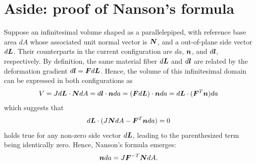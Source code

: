 \section{Aside: proof of Nanson's formula}
Suppose an infinitesimal volume shaped as a parallelepiped, with reference base area $dA$ whose associated unit normal vector is $\bm{N}$, and a out-of-plane side vector $d\bm{L}$. 
Their counterparts in the current configuration are $da$, $\bm{n}$, and $d\bm{l}$, respectively. 
By definition, the same material fiber $d\bm{L}$ and $d\bm{l}$ are related by the deformation gradient $d\bm{l} = \bm{F} d\bm{L}$. 
Hence, the volume of this infinitesimal domain can be expressed in both configurations as 
\begin{equation}
    V = J d\bm{L} \cdot \bm{N}dA = d\bm{l} \cdot \bm{n} da = (\bm{F}d\bm{L}) \cdot \bm{n}da = d\bm{L} \cdot (\bm{F}^T \bm{n}) da
\end{equation}
which suggests that
\begin{equation}
    d\bm{L} \cdot (J\bm{N}dA - \bm{F}^T \bm{n} da) = 0
\end{equation}
holds true for any non-zero side vector $d\bm{L}$, leading to the parenthesized term being identically zero. 
Hence, Nanson's formula emerges:
\begin{equation}
    \bm{n}da = J \bm{F}^{-T} \bm{N}dA.
\end{equation}

